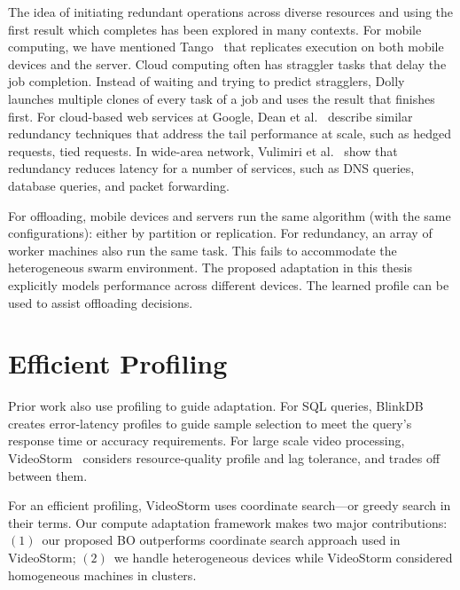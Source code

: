 \documentclass[thesis.tex]{subfiles}
\begin{document}
 The idea of initiating redundant
operations across diverse resources and using the first result which completes
has been explored in many contexts. For mobile computing, we have mentioned
Tango~\cite{gordon2015accelerating} that replicates execution on both mobile
devices and the server. Cloud computing often has straggler tasks that delay the
job completion. Instead of waiting and trying to predict stragglers,
Dolly~\cite{ananthanarayanan2013effective} launches multiple clones of every
task of a job and uses the result that finishes first. For cloud-based web
services at Google, Dean et al.~\cite{dean2013tail} describe similar redundancy
techniques that address the tail performance at scale, such as hedged requests,
tied requests. In wide-area network, Vulimiri et al.~\cite{vulimiri2013low} show
that redundancy reduces latency for a number of services, such as DNS queries,
database queries, and packet forwarding.

For offloading, mobile devices and servers run the same algorithm (with the same
configurations): either by partition or replication.  For redundancy, an array
of worker machines also run the same task. This fails to accommodate the
heterogeneous swarm environment. The proposed adaptation in this thesis
explicitly models performance across different devices. The learned profile can
be used to assist offloading decisions.

\section{Efficient Profiling}
\label{sec:prof-with-effic}

Prior work also use profiling to guide adaptation. For SQL queries, BlinkDB
creates error-latency profiles to guide sample selection to meet the query's
response time or accuracy requirements. For large scale video processing,
VideoStorm~\cite{zhang2017live} considers resource-quality profile and lag
tolerance, and trades off between them.

For an efficient profiling, VideoStorm uses coordinate search---or greedy search
in their terms. Our compute adaptation framework makes two major contributions:
$(1)$~our proposed BO outperforms coordinate search approach used in VideoStorm;
$(2)$~we handle heterogeneous devices while VideoStorm considered homogeneous
machines in clusters.
\end{document}
